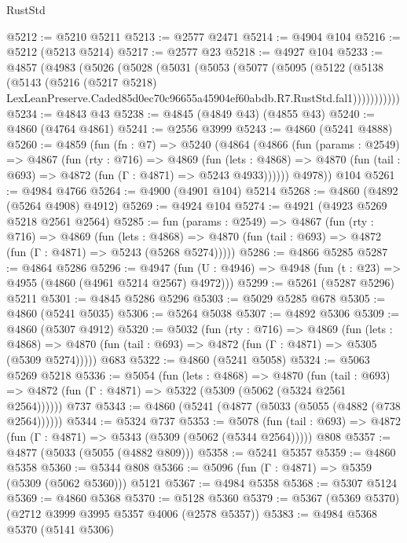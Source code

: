 \begin{lexlean}{RustStd}
\begin{coremodule}
@5212 := @5210 @5211
@5213 := @2577 @2471
@5214 := @4904 @104
@5216 := @5212 (@5213 @5214)
@5217 := @2577 @23
@5218 := @4927 @104
@5233 := @4857
    (@4983
      (@5026
        (@5028
          (@5031
            (@5053
              (@5077
                (@5095
                  (@5122
                    (@5138
                      (@5143
                        (@5216
                          (@5217 @5218)
                          LexLeanPreserve.Caded85d0ec70c96655a45904ef60abdb.R7.RustStd.fal1)))))))))))
@5234 := @4843 @43
@5238 := @4845 (@4849 @43) (@4855 @43)
@5240 := @4860 (@4764 @4861)
@5241 := @2556 @3999
@5243 := @4860 (@5241 @4888)
@5260 := @4859
    (fun (fn : @7) =>
    @5240
      (@4864
        (@4866
          (fun (params : @2549) =>
          @4867
            (fun (rty : @716) =>
            @4869
              (fun (lets : @4868) =>
              @4870 (fun (tail : @693) => @4872 (fun (Γ : @4871) => @5243 @4933))))))
        @4978))
    @104
@5261 := @4984 @4766
@5264 := @4900 (@4901 @104) @5214
@5268 := @4860 (@4892 (@5264 @4908) @4912)
@5269 := @4924 @104
@5274 := @4921 (@4923 @5269 @5218 @2561 @2564)
@5285 := fun (params : @2549) =>
  @4867
    (fun (rty : @716) =>
    @4869
      (fun (lets : @4868) =>
      @4870 (fun (tail : @693) => @4872 (fun (Γ : @4871) => @5243 (@5268 @5274)))))
@5286 := @4866 @5285
@5287 := @4864 @5286
@5296 := @4947 (fun (U : @4946) => @4948 (fun (t : @23) => @4955 (@4860 (@4961 @5214 @2567) @4972)))
@5299 := @5261 (@5287 @5296) @5211
@5301 := @4845 @5286 @5296
@5303 := @5029 @5285 @678
@5305 := @4860 (@5241 @5035)
@5306 := @5264 @5038
@5307 := @4892 @5306
@5309 := @4860 (@5307 @4912)
@5320 := @5032
    (fun (rty : @716) =>
    @4869
      (fun (lets : @4868) =>
      @4870 (fun (tail : @693) => @4872 (fun (Γ : @4871) => @5305 (@5309 @5274)))))
    @683
@5322 := @4860 (@5241 @5058)
@5324 := @5063 @5269 @5218
@5336 := @5054
    (fun (lets : @4868) =>
    @4870
      (fun (tail : @693) => @4872 (fun (Γ : @4871) => @5322 (@5309 (@5062 (@5324 @2561 @2564))))))
    @737
@5343 := @4860 (@5241 (@4877 (@5033 (@5055 (@4882 (@738 @2564))))))
@5344 := @5324 @737
@5353 := @5078
    (fun (tail : @693) => @4872 (fun (Γ : @4871) => @5343 (@5309 (@5062 (@5344 @2564)))))
    @808
@5357 := @4877 (@5033 (@5055 (@4882 @809)))
@5358 := @5241 @5357
@5359 := @4860 @5358
@5360 := @5344 @808
@5366 := @5096 (fun (Γ : @4871) => @5359 (@5309 (@5062 @5360))) @5121
@5367 := @4984 @5358
@5368 := @5307 @5124
@5369 := @4860 @5368
@5370 := @5128 @5360
@5379 := @5367 (@5369 @5370) (@2712 @3999 @3995 @5357 @4006 (@2578 @5357))
@5383 := @4984 @5368 @5370 (@5141 @5306)

\end{coremodule}
\end{lexlean}
